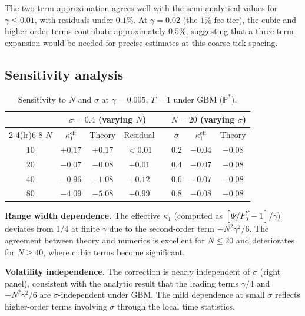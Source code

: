 \documentclass[11pt]{article}
\theoremstyle{definition}
\theoremstyle{remark}
\newcommand{\PP}{\mathbb{P}}
\begin{document}
The two-term approximation agrees well with the semi-analytical values
for $\gamma \le 0.01$, with residuals under $0.1\%$. At
$\gamma = 0.02$ (the $1\%$ fee tier), the cubic and higher-order
terms contribute approximately $0.5\%$, suggesting that a three-term
expansion would be needed for precise estimates at this coarse tick
spacing.

\subsection{Sensitivity analysis}

\begin{table}[h]
\centering
\caption{Sensitivity to $N$ and $\sigma$ at $\gamma = 0.005$,
$T = 1$ under GBM ($\PP^*$).}
\label{tab:sensitivity}
\begin{tabular}{cccccccc}
\toprule
& \multicolumn{3}{c}{$\sigma = 0.4$ (varying $N$)}
& \phantom{ab}
& \multicolumn{3}{c}{$N = 20$ (varying $\sigma$)} \\
\cmidrule(lr){2-4}\cmidrule(lr){6-8}
$N$ & $\kappa_1^{\mathrm{eff}}$ & Theory & Residual &
& $\sigma$ & $\kappa_1^{\mathrm{eff}}$ & Theory \\
\midrule
$10$ & $+0.17$ & $+0.17$ & $< 0.01$ &
& $0.2$ & $-0.04$ & $-0.08$ \\
$20$ & $-0.07$ & $-0.08$ & $+0.01$ &
& $0.4$ & $-0.07$ & $-0.08$ \\
$40$ & $-0.96$ & $-1.08$ & $+0.12$ &
& $0.6$ & $-0.07$ & $-0.08$ \\
$80$ & $-4.09$ & $-5.08$ & $+0.99$ &
& $0.8$ & $-0.08$ & $-0.08$ \\
\bottomrule
\end{tabular}
\end{table}

\textbf{Range width dependence.} The effective $\kappa_1$ (computed as
$[\Psi/F_0^Y - 1]/\gamma$) deviates from $1/4$ at finite $\gamma$
due to the second-order term $-N^2\gamma^2/6$. The agreement between
theory and numerics is excellent for $N \le 20$ and deteriorates for
$N \ge 40$, where cubic terms become significant.

\textbf{Volatility independence.} The correction is nearly independent
of $\sigma$ (right panel), consistent with the analytic result that
the leading terms $\gamma/4$ and $-N^2\gamma^2/6$ are
$\sigma$-independent under GBM. The mild dependence at small $\sigma$
reflects higher-order terms involving $\sigma$ through the local time
statistics.
\end{document}
